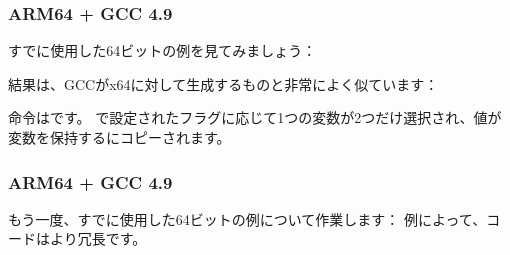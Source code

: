 \subsubsection{ARM64 + \Optimizing GCC 4.9}

すでに使用した64ビットの例を見てみましょう：



結果は、GCCがx64に対して生成するものと非常によく似ています：

\CSEL 命令はです。 
\TST で設定されたフラグに応じて1つの変数が2つだけ選択され、値が 変数を保持するにコピーされます。

\subsubsection{ARM64 + \NonOptimizing GCC 4.9}

もう一度、すでに使用した64ビットの例について作業します：
例によって、コードはより冗長です。



